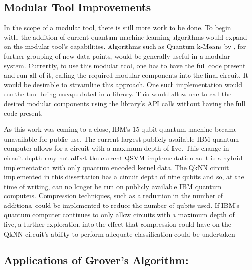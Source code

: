 \subsection{Modular Tool Improvements}
In the scope of a modular tool, there is still more work to be done. To begin with, the addition of current quantum machine learning algorithms would expand on the modular tool's capabilities. Algorithms such as Quantum k-Means by \citeauthor{Khan2019} \citep{Khan2019}, for further grouping of new data points, would be generally useful in a modular system. Currently, to use this modular tool, one has to have the full code present and run all of it, calling the required  modular components into the final circuit. It would be desirable to streamline this approach. One such implementation would see the tool being encapsulated in a library. This would allow one to call the desired modular components using the library's API calls without having the full code present. %

As this work was coming to a close, IBM's 15 qubit quantum machine became unavailable for public use. The current largest publicly available IBM quantum computer allows for a circuit with a maximum depth of five. This change in circuit depth may not affect the current QSVM implementation as it is a hybrid implementation with only quantum encoded kernel data. The QkNN circuit implemented in this dissertation has a circuit depth of nine qubits and so, at the time of writing, can no longer be run on publicly available IBM quantum computers. %
Compression techniques, such as a reduction in the number of additions, could be implemented to reduce the number of qubits used. If %
IBM's quantum computer continues to only allow circuits with a maximum depth of five, %
a further exploration into the effect that %
compression could have on the QkNN circuit's ability to perform adequate classification could be undertaken.



\subsection{ Applications of Grover's Algorithm: \citeauthor{MarkSwee}}

